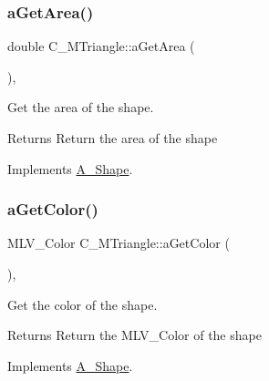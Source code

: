 \subsubsection{\texorpdfstring{a\+Get\+Area()}{aGetArea()}\hspace{0.1cm}{\footnotesize\ttfamily [2/2]}}
{\footnotesize\ttfamily double C\+\_\+\+M\+Triangle\+::a\+Get\+Area (\begin{DoxyParamCaption}{ }\end{DoxyParamCaption})\hspace{0.3cm}{\ttfamily [override]}, {\ttfamily [virtual]}}



Get the area of the shape. 

\begin{DoxyReturn}{Returns}
Return the area of the shape 
\end{DoxyReturn}


Implements \hyperlink{classA__Shape_a1b142ee2d873d6c217f65de1632e7b6e}{A\+\_\+\+Shape}.

\mbox{\label{classC__MTriangle_aa567d77ce0e6d664beb6eea9268b1bc3}} 
\subsubsection{\texorpdfstring{a\+Get\+Color()}{aGetColor()}\hspace{0.1cm}{\footnotesize\ttfamily [1/2]}}
{\footnotesize\ttfamily M\+L\+V\+\_\+\+Color C\+\_\+\+M\+Triangle\+::a\+Get\+Color (\begin{DoxyParamCaption}{ }\end{DoxyParamCaption})\hspace{0.3cm}{\ttfamily [override]}, {\ttfamily [virtual]}}



Get the color of the shape. 

\begin{DoxyReturn}{Returns}
Return the M\+L\+V\+\_\+\+Color of the shape 
\end{DoxyReturn}


Implements \hyperlink{classA__Shape_a1e90c8132d33e4ac84d42f72606193b2}{A\+\_\+\+Shape}.

\mbox{\label{classC__MTriangle_aa567d77ce0e6d664beb6eea9268b1bc3}} 
